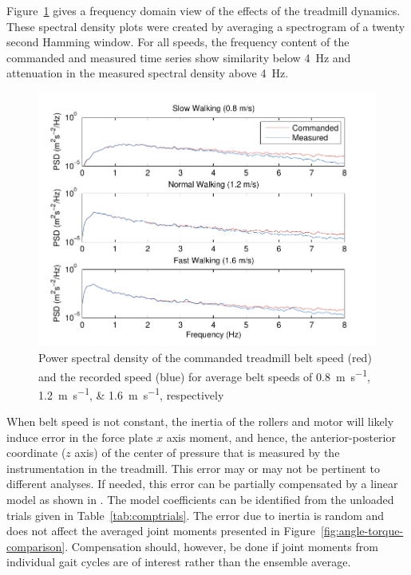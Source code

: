 \documentclass[fleqn,12pt]{wlpeerj}
\begin{document}
Figure~\ref{fig:freq_analysis} gives a frequency domain view of the effects of
the treadmill dynamics. These spectral density plots were created by averaging
a spectrogram of a twenty second Hamming window. For all speeds, the frequency
content of the commanded and measured time series show similarity below
4~\si{\hertz} and attenuation in the measured spectral density above
4~\si{\hertz}.
%
\begin{figure}
  \centering
  \includegraphics{figures/frequency_analysis.pdf}
  \caption{Power spectral density of the commanded treadmill belt speed
    (red) and the recorded speed (blue) for average belt speeds of
    \SIlist{0.8;1.2;1.6}{\meter\per\second}, respectively}
  \label{fig:freq_analysis}
\end{figure}

When belt speed is not constant, the inertia of the rollers and motor will
likely induce error in the force plate $x$ axis moment, and hence, the
anterior-posterior coordinate ($z$ axis) of the center of pressure that is
measured by the instrumentation in the treadmill. This error may or may not be
pertinent to different analyses. If needed, this error can be partially
compensated by a linear model as shown in \cite{Hnat2014}. The model
coefficients can be identified from the unloaded trials given in
Table~\ref{tab:comptrials}. The error due to inertia is random and does not
affect the averaged joint moments presented in
Figure~\ref{fig:angle-torque-comparison}. Compensation should, however, be done
if joint moments from individual gait cycles are of interest rather than the
ensemble average.
%
\begin{table}
  \cprotect\caption{A list of unloaded trials collected for each speed. Each
    loaded trial includes a compensation file listed in its meta data which
    matches it to these unloaded trials. Generated by
    \verb|src/subject_table.py|.}
  \centering
  \small
  
  \label{tab:comptrials}
\end{table}
\end{document}
